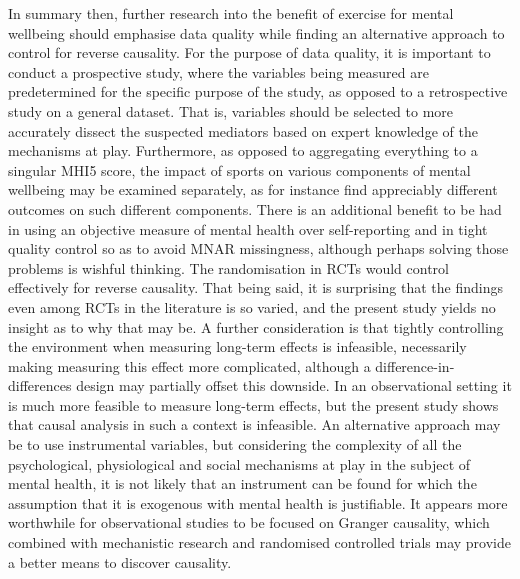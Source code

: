In summary then, further research into the benefit of exercise for mental wellbeing should emphasise data quality
while finding an alternative approach to control for reverse causality.
For the purpose of data quality, it is important to conduct a prospective study, where the variables being measured
are predetermined for the specific purpose of the study, as opposed to a retrospective study on a general dataset.
That is, variables should be selected to more accurately dissect the suspected mediators based on expert knowledge
of the mechanisms at play. Furthermore, as opposed to aggregating everything to a singular MHI5 score,
the impact of sports on various components of mental wellbeing may be examined separately, as for instance
 find appreciably different outcomes on such different components.
There is an additional benefit to be had in using an objective measure of mental health over self-reporting and in
tight quality control so as to avoid MNAR missingness, although perhaps solving those problems is wishful thinking.
The randomisation in RCTs would control effectively for reverse causality. That being said, it is surprising that
the findings even among RCTs in the literature is so varied, and the present study yields no insight as to why that may be.
A further consideration is that tightly controlling the environment when measuring long-term effects is infeasible,
necessarily making measuring this effect more complicated, although a difference-in-differences design may partially
offset this downside.
In an observational setting it is much more feasible to measure long-term effects, but the present study shows
that causal analysis in such a context is infeasible. An alternative approach may be to use instrumental variables,
but considering the complexity of all the psychological, physiological and social mechanisms at play in the subject of
mental health, it is not likely that an instrument can be found for which the assumption that it is exogenous
with mental health is justifiable.
It appears more worthwhile for observational studies to be focused on Granger causality, which combined with
mechanistic research and randomised controlled trials may provide a better means to discover causality.
